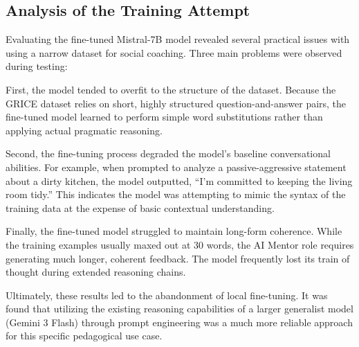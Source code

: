 \subsection{Analysis of the Training Attempt}
Evaluating the fine-tuned Mistral-7B model revealed several practical issues with using a narrow dataset for social coaching. Three main problems were observed during testing:

First, the model tended to overfit to the structure of the dataset. Because the GRICE dataset relies on short, highly structured question-and-answer pairs, the fine-tuned model learned to perform simple word substitutions rather than applying actual pragmatic reasoning.

Second, the fine-tuning process degraded the model's baseline conversational abilities. For example, when prompted to analyze a passive-aggressive statement about a dirty kitchen, the model outputted, ``I'm committed to keeping the living room tidy.'' This indicates the model was attempting to mimic the syntax of the training data at the expense of basic contextual understanding.

Finally, the fine-tuned model struggled to maintain long-form coherence. While the training examples usually maxed out at 30 words, the AI Mentor role requires generating much longer, coherent feedback. The model frequently lost its train of thought during extended reasoning chains.

Ultimately, these results led to the abandonment of local fine-tuning. It was found that utilizing the existing reasoning capabilities of a larger generalist model (Gemini 3 Flash) through prompt engineering was a much more reliable approach for this specific pedagogical use case.